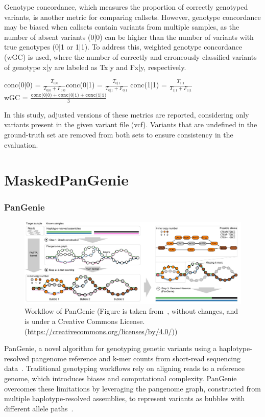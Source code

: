 \documentclass{PHlab-thesis}
\begin{document}
Genotype concordance, which measures the proportion of correctly genotyped variants, is another metric for comparing callsets. However, genotype concordance may be biased when callsets contain variants from multiple samples, as the number of absent variants (0|0) can be higher than the number of variants with true genotypes (0|1 or 1|1). To address this, weighted genotype concordance (wGC) is used, where the number of correctly and erroneously classified variants of genotype x|y are labeled as Tx|y and Fx|y, respectively.
\begin{center}
    conc(0|0) = $\frac{T_{0|0}}{T_{0|0} + F_{0|0}}$\hspace{0.5cm}conc(0|1) = $\frac{T_{0|1}}{T_{0|1} + F_{0|1}}$\hspace{0.5cm} conc(1|1) = $\frac{T_{1|1}}{T_{1|1} + F_{1|1}}$\\
    \vspace{1cm}
    wGC = $\frac{\texttt{conc(0|0)} + \texttt{conc(0|1)} + \texttt{conc(1|1)}}{3}$
\end{center}

In this study, adjusted versions of these metrics are reported, considering only variants present in the given variant file (vcf). Variants that are undefined in the ground-truth set are removed from both sets to ensure consistency in the evaluation.
\section{MaskedPanGenie}
\subsubsection{PanGenie}
\begin{figure}
	\centering
	\includegraphics[scale=0.4]{figures/workflow of PanGenie.jpg}
	\caption{Workflow of PanGenie (Figure is taken from~\cite{1}, without changes, and is under a Creative Commons License.(\url{https://creativecommons.org/licenses/by/4.0/}))}
	\label{fig:PanGenie} %
\end{figure}
PanGenie, a novel algorithm for genotyping genetic variants using a haplotype-resolved pangenome reference and k-mer counts from short-read sequencing data~\cite{elber2022PanGenie}. Traditional genotyping workflows rely on aligning reads to a reference genome, which introduces biases and computational complexity. PanGenie overcomes these limitations by leveraging the pangenome graph, constructed from multiple haplotype-resolved assemblies, to represent variants as bubbles with different allele paths~\cite{elber2022PanGenie}.
\end{document}
